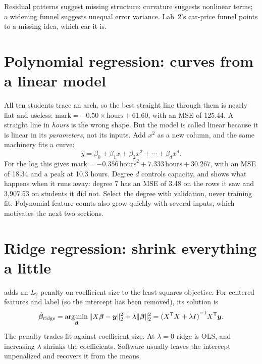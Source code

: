 \begin{keyidea}
Residual patterns suggest missing structure: curvature suggests nonlinear terms; a widening funnel suggests unequal error variance. Lab~2's car-price funnel points to a missing idea, which car it is.
\end{keyidea}

\section{Polynomial regression: curves from a linear model}

All ten students trace an arch, so the best straight line through them is nearly flat and useless: $\text{mark}=-0.50\times\text{hours}+61.60$, with an MSE of 125.44. A straight line in \emph{hours} is the wrong shape. But the model is called linear because it is linear in its \emph{parameters}, not its inputs. Add $x^2$ as a new column, and the same machinery fits a curve:
\[
  \hat{y}=\beta_0+\beta_1x+\beta_2x^2+\cdots+\beta_dx^d.
\]
For the log this gives $\text{mark}=-0.356\,\text{hours}^2+7.333\,\text{hours}+30.267$, with an MSE of 18.34 and a peak at 10.3 hours. Degree $d$ controls capacity, and  shows what happens when it runs away: degree 7 has an MSE of 3.48 on the rows it saw and 3,907.53 on students it did not. Select the degree with validation, never training fit. Polynomial feature counts also grow quickly with several inputs, which motivates the next two sections.

\section{Ridge regression: shrink everything a little}

 adds an $L_2$ penalty on coefficient size to the least-squares objective. For centered features and label (so the intercept has been removed), its solution is
\[
  \hat{\bm{\beta}}_{\mathrm{ridge}}
  =\operatorname*{arg\,min}_{\bm{\beta}}
  \|X\bm{\beta}-\bm{y}\|_2^2
  +\lambda\|\bm{\beta}\|_2^2
  ={(X^{\mathsf T}X+\lambda I)}^{-1}X^{\mathsf T}\bm{y}.
\]
The penalty trades fit against coefficient size. At $\lambda=0$ ridge is OLS, and increasing $\lambda$ shrinks the coefficients. Software usually leaves the intercept unpenalized and recovers it from the means.

